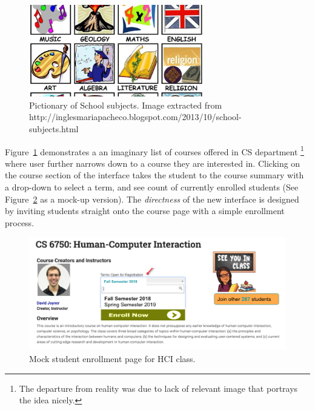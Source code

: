 \documentclass[12pt,letterpaper]{article}
\begin{document}
\begin{figure}[h]
\centering
\includegraphics[width=3in,scale=.3]{figures/p2/school_subjects_modified.jpg}
\caption{Pictionary of School subjects. Image extracted from http://inglesmariapacheco.blogspot.com/2013/10/school-subjects.html}
\label{fig::1}
\end{figure}

Figure~\ref{fig::1} demonstrates a an imaginary list of courses offered in CS department \footnote{The departure from reality was due to lack of relevant image that portrays the idea nicely.} where user further narrows down to a course they are interested in. Clicking on the course section of the interface takes the student to the course summary with a drop-down to select a term, and see count of currently enrolled students (See Figure~\ref{fig::2} as a mock-up version). The \textit{directness} of the new interface is designed by inviting students straight onto the course page with a simple enrollment process. 

\begin{figure}[h]
\centering
\includegraphics[scale=.5]{figures/p2/gatech_enrollment.png}
\caption{Mock student enrollment page for HCI class.}
\label{fig::2}
\end{figure}
\end{document}
